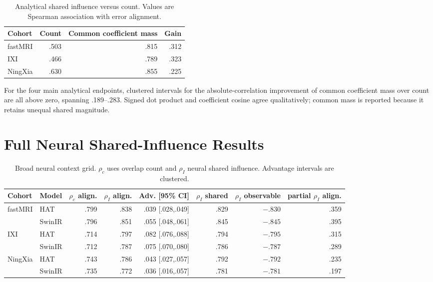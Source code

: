 \documentclass[10pt,twocolumn,letterpaper]{article}
\begin{document}
\begin{table}[t]
\centering
\caption{Analytical shared influence versus count. Values are Spearman association with error alignment.}
\label{tab:analytic}
\setlength{\tabcolsep}{5pt}
\begin{tabular}{lrrr}
\toprule
Cohort & Count & Common coefficient mass & Gain \\
\midrule
fastMRI & .503 & .815 & .312 \\
IXI & .466 & .789 & .323 \\
NingXia & .630 & .855 & .225 \\
\bottomrule
\end{tabular}
\end{table}

For the four main analytical endpoints, clustered intervals for the absolute-correlation improvement of common coefficient mass over count are all above zero, spanning .189--.283. Signed dot product and coefficient cosine agree qualitatively; common mass is reported because it retains unequal shared magnitude.

\section{Full Neural Shared-Influence Results}
\begin{table}[t]
\centering
\caption{Broad neural context grid. $\rho_c$ uses overlap count and $\rho_I$ neural shared influence. Advantage intervals are clustered.}
\label{tab:neural-full}
\scriptsize
\setlength{\tabcolsep}{3pt}
\begin{tabular}{llrrrrrr}
\toprule
Cohort & Model & $\rho_c$ align. & $\rho_I$ align. & Adv. [95\% CI] & $\rho_I$ shared & $\rho_I$ observable & partial $\rho_I$ align. \\
\midrule
fastMRI & HAT & .799 & .838 & .039 [.028,.049] & .829 & $-.830$ & .359 \\
 & SwinIR & .796 & .851 & .055 [.048,.061] & .845 & $-.845$ & .395 \\
IXI & HAT & .714 & .797 & .082 [.076,.088] & .794 & $-.795$ & .315 \\
 & SwinIR & .712 & .787 & .075 [.070,.080] & .786 & $-.787$ & .289 \\
NingXia & HAT & .743 & .786 & .043 [.027,.057] & .792 & $-.792$ & .235 \\
 & SwinIR & .735 & .772 & .036 [.016,.057] & .781 & $-.781$ & .197 \\
\bottomrule
\end{tabular}
\end{table}
\end{document}
